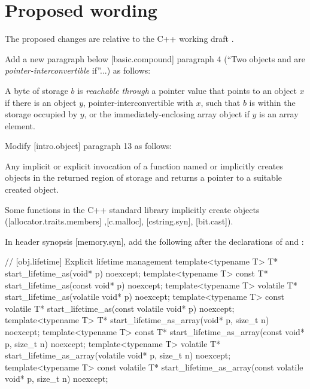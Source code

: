 
\section{Proposed wording}
\label{sec:wording}

The proposed changes are relative to the C++ working draft \cite{N4910}. 

Add a new paragraph below [basic.compound] paragraph 4 (``Two objects  and  are \emph{pointer-interconvertible} if''...) as follows:

\begin{addedblock}
\begin{adjustwidth}{0.5cm}{0.5cm}
 A byte of storage $b$ is \emph{reachable through} a pointer value that points to an object $x$ if there is an object $y$, pointer-interconvertible with $x$, such that $b$ is within the storage occupied by $y$, or the immediately-enclosing array object if $y$ is an array element.
\end{adjustwidth}
\end{addedblock}

Modify [intro.object] paragraph 13 as follows:

\begin{adjustwidth}{0.5cm}{0.5cm}
Any implicit or explicit invocation of a function
named  or 
implicitly creates objects in the returned region of storage and
returns a pointer to a suitable created object.
\begin{note}
Some functions in the C++ standard library implicitly create objects ([allocator.traits.members] ,[c.malloc], [cstring.syn], [bit.cast]).
\end{note}

\end{adjustwidth}

In header  synopsis [memory.syn], add the following after the declarations of  and :

\begin{adjustwidth}{0.5cm}{0.5cm}

\begin{addedblock}
\begin{codeblock}
// [obj.lifetime] Explicit lifetime management
template<typename T>
  T* start_lifetime_as(void* p) noexcept;
template<typename T>
  const T* start_lifetime_as(const void* p) noexcept;
template<typename T>
  volatile T* start_lifetime_as(volatile void* p) noexcept;
template<typename T>
  const volatile T* start_lifetime_as(const volatile void* p) noexcept;
template<typename T>
  T* start_lifetime_as_array(void* p, size_t n) noexcept;
template<typename T>
  const T* start_lifetime_as_array(const void* p, size_t n) noexcept;
template<typename T>
  volatile T* start_lifetime_as_array(volatile void* p, size_t n) noexcept;
template<typename T>
  const volatile T* start_lifetime_as_array(const volatile void* p, size_t n) noexcept;
\end{codeblock}
\end{addedblock}
\end{adjustwidth}

